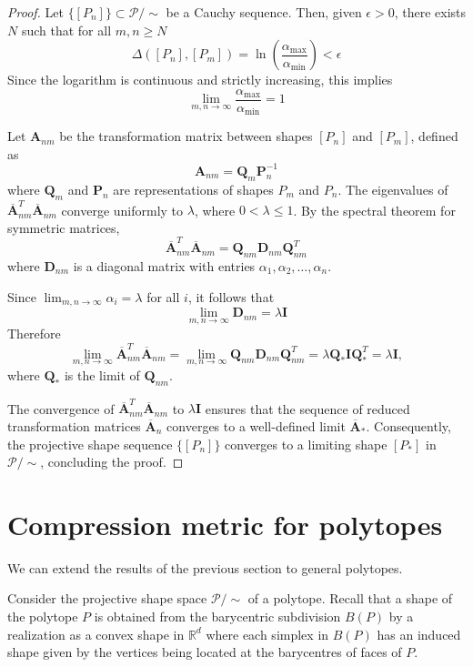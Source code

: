 \documentclass[a4paper, 12pt]{amsart}
\theoremstyle{plain}
\begin{document}
\begin{proof}
Let $\{[P_n]\} \subset \mathcal{P}/\sim$ be a Cauchy sequence. Then, given $\epsilon > 0$, there exists $N$ such that for all $m, n \geq N$
$$
\Delta([P_n], [P_m]) = \ln \left(\frac{\alpha_{\max}}{\alpha_{\min}}\right) < \epsilon
$$
Since the logarithm is continuous and strictly increasing, this implies
$$
\lim_{m,n \to \infty} \frac{\alpha_{\max}}{\alpha_{\min}} = 1
$$

Let $\mathbf{A}_{nm}$ be the transformation matrix between shapes $[P_n]$ and $[P_m]$, defined as
$$
\mathbf{A}_{nm} = \mathbf{Q}_m \mathbf{P}_n^{-1}
$$
where $\mathbf{Q}_m$ and $\mathbf{P}_n$ are representations of shapes $P_m$ and $P_n$. The eigenvalues of $\overline{\mathbf{A}}_{nm}^T \overline{\mathbf{A}}_{nm}$ converge uniformly to $\lambda$,  where $0 < \lambda \le 1$. By the spectral theorem for symmetric matrices,
$$
\overline{\mathbf{A}}_{nm}^T \overline{\mathbf{A}}_{nm} = \mathbf{Q}_{nm} \mathbf{D}_{nm} \mathbf{Q}_{nm}^T
$$
where $\mathbf{D}_{nm}$ is a diagonal matrix with entries $\alpha_1, \alpha_2, \dots, \alpha_n$. 

Since $\lim_{m,n \to \infty} \alpha_i = \lambda$ for all $i$, it follows that
$$
\lim_{m,n \to \infty} \mathbf{D}_{nm} = \lambda \mathbf{I}
$$
Therefore
$$
\lim_{m,n \to \infty} \overline{\mathbf{A}}_{nm}^T \overline{\mathbf{A}}_{nm} = \lim_{m,n \to \infty} \mathbf{Q}_{nm} \mathbf{D}_{nm} \mathbf{Q}_{nm}^T = \lambda\mathbf{Q}_* \mathbf{I} \mathbf{Q}_*^T = \lambda \mathbf{I},
$$
where $\mathbf{Q}_*$ is the limit of $\mathbf{Q}_{nm}$.

The convergence of $\overline{\mathbf{A}}_{nm}^T \overline{\mathbf{A}}_{nm}$ to $\lambda \mathbf{I}$ ensures that the sequence of reduced transformation matrices $\overline{\mathbf{A}}_n$ converges to a well-defined limit $\overline{\mathbf{A}}_*$. Consequently, the projective shape sequence $\{[P_n]\}$ converges to a limiting shape $[P_*]$ in $\mathcal{P}/\sim$, concluding the proof.
\end{proof}



\section{Compression metric for polytopes}

We can extend the results of the previous section to general polytopes. 

Consider the projective shape space $\mathcal{P}/\sim$ of a polytope. Recall that a shape of the polytope $P$ is obtained from the barycentric subdivision $B(P)$ by a realization as a convex shape in $\mathbb{R}^d$ where each simplex in $B(P)$ has an induced shape given by the vertices being  located at the barycentres of faces of $P$. 
\end{document}
